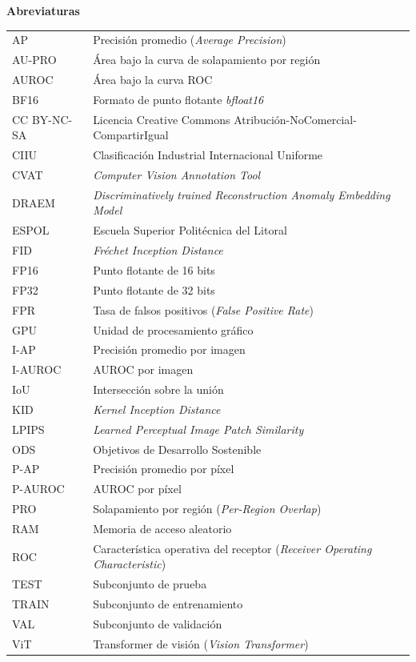 \documentclass[12pt,oneside]{report}
\begin{document}
\clearpage
{}
{\centering\textbf{Abreviaturas}\par}
\begingroup\singlespacing\renewcommand{\arraystretch}{1.25}
\noindent\begin{tabular}{@{}p{3cm}p{12cm}}
AP & Precisión promedio (\textit{Average Precision}) \\
AU-PRO & Área bajo la curva de solapamiento por región \\
AUROC & Área bajo la curva ROC \\
BF16 & Formato de punto flotante \textit{bfloat16} \\
CC BY-NC-SA & Licencia Creative Commons Atribución-NoComercial-CompartirIgual \\
CIIU & Clasificación Industrial Internacional Uniforme \\
CVAT & \textit{Computer Vision Annotation Tool} \\
DRAEM & \textit{Discriminatively trained Reconstruction Anomaly Embedding Model} \\
ESPOL & Escuela Superior Politécnica del Litoral \\
FID & \textit{Fréchet Inception Distance} \\
FP16 & Punto flotante de 16 bits \\
FP32 & Punto flotante de 32 bits \\
FPR & Tasa de falsos positivos (\textit{False Positive Rate}) \\
GPU & Unidad de procesamiento gráfico \\
I-AP & Precisión promedio por imagen \\
I-AUROC & AUROC por imagen \\
IoU & Intersección sobre la unión \\
KID & \textit{Kernel Inception Distance} \\
LPIPS & \textit{Learned Perceptual Image Patch Similarity} \\
ODS & Objetivos de Desarrollo Sostenible \\
P-AP & Precisión promedio por píxel \\
P-AUROC & AUROC por píxel \\
PRO & Solapamiento por región (\textit{Per-Region Overlap}) \\
RAM & Memoria de acceso aleatorio \\
ROC & Característica operativa del receptor (\textit{Receiver Operating Characteristic}) \\
TEST & Subconjunto de prueba \\
TRAIN & Subconjunto de entrenamiento \\
VAL & Subconjunto de validación \\
ViT & Transformer de visión (\textit{Vision Transformer}) \\
\end{tabular}
\endgroup
\end{document}
